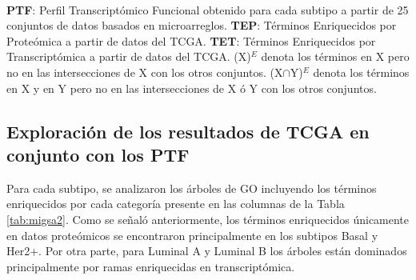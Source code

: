 \documentclass[12pt,twoside]{reedthesis}
\begin{document}
\begin{table}[!h]
  \caption{Número de términos enriquecidos compartidos entre plataformas y múltiples ómicas para cada subtipo.}
  \label{tab:migsa2}
  \\ \textbf{PTF}: Perfil Transcriptómico Funcional obtenido para cada subtipo a partir de 25 conjuntos de datos basados en microarreglos. \textbf{TEP}: Términos Enriquecidos por Proteómica a partir de datos del TCGA. \textbf{TET}: Términos Enriquecidos por Transcriptómica a partir de datos del TCGA. (X)$^E$ denota los términos en X pero no en las intersecciones de X con los otros conjuntos. (X$\cap$Y)$^E$ denota los términos en X y en Y pero no en las intersecciones de X ó Y con los otros conjuntos.
\end{table}
\hypertarget{exploraciuxf3n-de-los-resultados-de-tcga-en-conjunto-con-los-ptf}{%
\subsection{Exploración de los resultados de TCGA en conjunto con los PTF}\label{exploraciuxf3n-de-los-resultados-de-tcga-en-conjunto-con-los-ptf}}

\par

Para cada subtipo, se analizaron los árboles de GO incluyendo los términos enriquecidos por cada categoría presente en las columnas de la Tabla \ref{tab:migsa2}. Como se señaló anteriormente, los términos enriquecidos únicamente en datos proteómicos se encontraron principalmente en los subtipos Basal y Her2+. Por otra parte, para Luminal A y Luminal B los árboles están dominados principalmente por ramas enriquecidas en transcriptómica.
\end{document}
